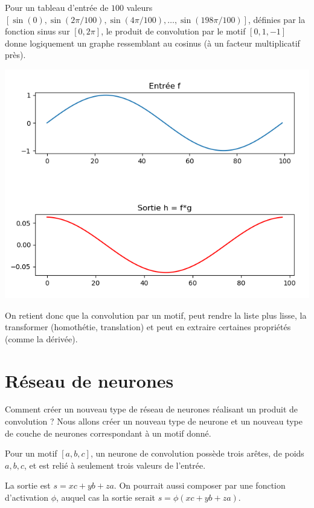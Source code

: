 \documentclass[11pt,class=report,crop=false]{standalone}
\begin{document}
Pour un tableau d'entrée de $100$ valeurs $[\sin(0),\sin(2\pi/100),\sin(4\pi/100),\ldots,\sin(198\pi/100)]$, définies par la fonction sinus sur $[0,2\pi]$, le produit de convolution par le motif $[0,1,-1]$ donne logiquement un graphe ressemblant au cosinus (à un facteur multiplicatif près).
\begin{center}
\includegraphics[scale=\myscale,scale=0.6]{figures/convolution-1d-4}
\end{center}


On retient donc que la convolution par un motif, peut rendre la liste plus lisse, la transformer (homothétie, translation) et peut en extraire certaines propriétés (comme la dérivée).


\section{Réseau de neurones}


Comment créer un nouveau type de réseau de neurones réalisant un produit de convolution ?
Nous allons créer un nouveau type de neurone et un nouveau type de couche de neurones correspondant à un motif donné.

Pour un motif  $[a,b,c]$, un neurone de convolution possède trois arêtes, de poids $a,b,c$, et est relié à seulement trois valeurs de l'entrée.



La sortie est $s=xc+yb+za$. On pourrait aussi composer par une fonction d'activation $\phi$, auquel cas la sortie serait $s=\phi(xc+yb+za)$.
\end{document}
